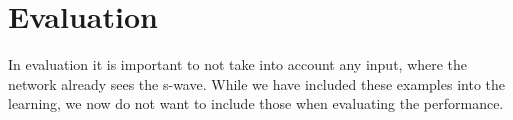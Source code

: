 \documentclass[thesis.tex]{subfiles}
\begin{document}
\chapter{Evaluation}\label{chap:eva}
In evaluation it is important to not take into account any input, where the network already sees the s-wave. While we have included these examples into the learning, we now do not want to include those when evaluating the performance.

\subfilebib %
\end{document}
